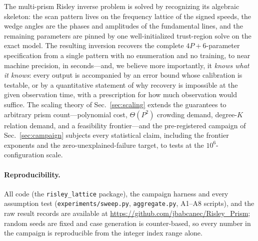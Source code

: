 \documentclass[twocolumn,preprintnumbers,amsmath,amssymb,pra,floatfix]{revtex4-2}
\begin{document}
The multi-prism Risley inverse problem is solved by recognizing its
algebraic skeleton: the scan pattern lives on the frequency lattice of
the signed speeds, the wedge angles are the phases and amplitudes of
the fundamental lines, and the remaining parameters are pinned by one
well-initialized trust-region solve on the exact model.  The resulting
inversion recovers the complete $4P+6$-parameter specification from a
single pattern with no enumeration and no training, to near machine
precision, in seconds---and, we believe more importantly, it
\emph{knows what it knows}: every output is accompanied by an error
bound whose calibration is testable, or by a quantitative statement
of why recovery is impossible at the given observation time, with a
prescription for how much observation would suffice.  The scaling
theory of Sec.~\ref{sec:scaling} extends the guarantees to arbitrary
prism count---polynomial cost, $\Theta(P^{2})$ crowding demand,
degree-$K$ relation demand, and a feasibility frontier---and the
pre-registered campaign of Sec.~\ref{sec:campaign} subjects every
statistical claim, including the frontier exponents and the
zero-unexplained-failure target, to tests at the $10^{6}$-configuration
scale.

\paragraph{Reproducibility.}
All code (the \texttt{risley\_lattice} package), the campaign harness
and every assumption test (\texttt{experiments/sweep.py},
\texttt{aggregate.py}, A1--A8 scripts), and the raw result records
are available at \url{https://github.com/jbabcanec/Risley_Prism};
random seeds are fixed and case generation is counter-based, so every
number in the campaign is reproducible from the integer index range
alone.
\end{document}
